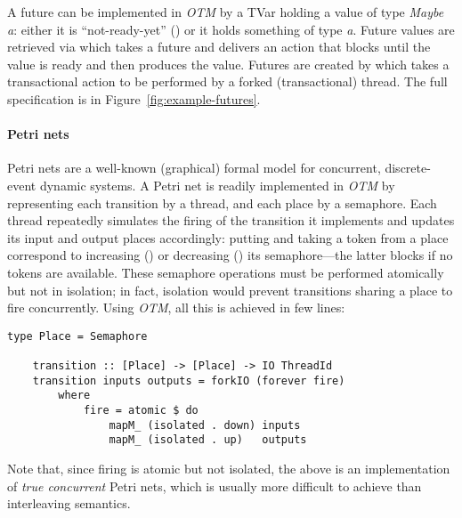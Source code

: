A future can be implemented in \emph{OTM} by a TVar
holding a value of type \emph{Maybe a}: either it is
``not-ready-yet'' () or it holds something 
of type \emph{a}.
Future values are retrieved via  which takes 
a future and delivers an action that blocks until the value is
ready and then produces the value.
Futures are created by  which takes a transactional
action to be performed by a forked (transactional) thread. 
The full specification is in Figure~\ref{fig:example-futures}.

\paragraph{Petri nets}
Petri nets are a well-known (graphical) formal model for concurrent, discrete-event dynamic systems.
A Petri net is readily implemented in \emph{OTM} 
by representing each transition by a thread, and each place by a semaphore.
Each thread repeatedly simulates the firing of the transition it 
implements and updates its input and output places accordingly:
putting and taking a token from a place correspond to 
increasing () or decreasing ()
its semaphore---the latter blocks if no tokens are available.
These semaphore operations must be 
performed atomically but not in isolation; in fact, 
isolation would prevent transitions sharing a place to
fire concurrently. 
Using \emph{OTM}, all this is achieved in few lines:
\begin{Verbatim}[tabsize=3, xleftmargin=1ex, gobble=1]
    type Place = Semaphore
    
    transition :: [Place] -> [Place] -> IO ThreadId
    transition inputs outputs = forkIO (forever fire)
        where 
            fire = atomic $ do
                mapM_ (isolated . down) inputs
                mapM_ (isolated . up)   outputs
\end{Verbatim}
Note that, since firing is atomic but not isolated,
the above is an implementation of \emph{true concurrent} Petri nets, which is usually more difficult to achieve than interleaving semantics.

